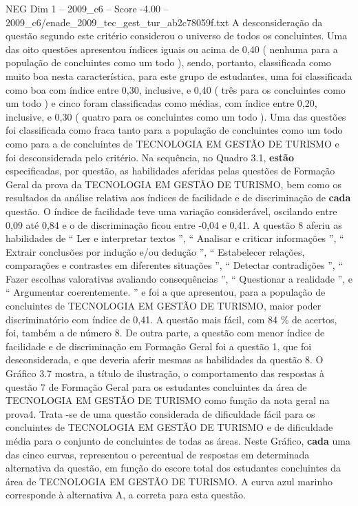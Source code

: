 \begin{textsample}{NEG Dim 1 – 2009\_c6 – Score -4.00 – 2009\_c6/enade\_2009\_tec\_gest\_tur\_ab2c78059f.txt}
A desconsideração da questão segundo este critério considerou o universo de todos os concluintes.
Uma das oito questões apresentou índices iguais ou acima de 0,40 ( nenhuma para a população de concluintes como um todo ), sendo, portanto, classificada como muito boa nesta característica, para este grupo de estudantes, uma foi classificada como boa com índice entre 0,30, inclusive, e 0,40 ( três para os concluintes como um todo ) e cinco foram classificadas como médias, com índice entre 0,20, inclusive, e 0,30 ( quatro para os concluintes como um todo ).
Uma das questões foi classificada como fraca tanto para a população de concluintes como um todo como para a de concluintes de TECNOLOGIA EM GESTÃO DE TURISMO e foi desconsiderada pelo critério.
Na sequência, no Quadro 3.1, \textbf{estão} especificadas, por questão, as habilidades aferidas pelas questões de Formação Geral da prova da TECNOLOGIA EM GESTÃO DE TURISMO, bem como os resultados da análise relativa aos índices de facilidade e de discriminação de \textbf{cada} questão.
O índice de facilidade teve uma variação considerável, oscilando entre 0,09 até 0,84 e o de discriminação ficou entre -0,04 e 0,41.
A questão 8 aferiu as habilidades de “ Ler e interpretar textos ”, “ Analisar e criticar informações ”, “ Extrair conclusões por indução e/ou dedução ”, “ Estabelecer relações, comparações e contrastes em diferentes situações ”, “ Detectar contradições ”, “ Fazer escolhas valorativas avaliando consequências ”, “ Questionar a realidade ”, e “ Argumentar coerentemente. ” e foi a que apresentou, para a população de concluintes de TECNOLOGIA EM GESTÃO DE TURISMO, maior poder discriminatório com índice de 0,41.
A questão mais fácil, com 84 \% de acertos, foi, também a de número 8.
De outra parte, a questão com menor índice de facilidade e de discriminação em Formação Geral foi a questão 1, que foi desconsiderada, e que deveria aferir mesmas as habilidades da questão 8.
O Gráfico 3.7 mostra, a título de ilustração, o comportamento das respostas à questão 7 de Formação Geral para os estudantes concluintes da área de TECNOLOGIA EM GESTÃO DE TURISMO como função da nota geral na prova4.
Trata -se de uma questão considerada de dificuldade fácil para os concluintes de TECNOLOGIA EM GESTÃO DE TURISMO e de dificuldade média para o conjunto de concluintes de todas as áreas.
Neste Gráfico, \textbf{cada} uma das cinco curvas, representou o percentual de respostas em determinada alternativa da questão, em função do escore total dos estudantes concluintes da área de TECNOLOGIA EM GESTÃO DE TURISMO.
A curva azul marinho corresponde à alternativa A, a correta para esta questão.

\end{textsample}

